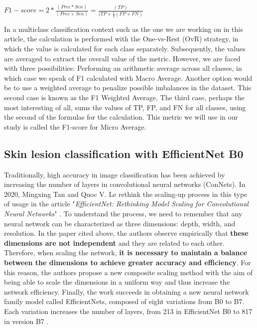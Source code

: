 \begin{enumerate}
    \hspace{3cm} $F1-score = 2 * \frac{(Prec * Sen)}{(Prec + Sen)} = \frac{(TP)}{(TP + \frac{1}{2}(FP + FN)}$

    In a multiclass classification context such as the one we are working on in this article, the calculation is performed with the One-vs-Rest (OvR) strategy, in which the value is calculated for each class separately. Subsequently, the values are averaged to extract the overall value of the metric. However, we are faced with three possibilities: Performing an arithmetic average across all classes, in which case we speak of F1 calculated with Macro Average. Another option would be to use a weighted average to penalize possible imbalances in the dataset. This second case is known as the F1 Weighted Average. The third case, perhaps the most interesting of all, sums the values of TP, FP, and FN for all classes, using the second of the formulas for the calculation. This metric we will use in our study is called the F1-score for Micro Average.
    
    
\end{enumerate}
    


\subsection{Skin lesion classification with EfficientNet B0}
Traditionally, high accuracy in image classification has been achieved by increasing the number of layers in convolutional neural networks (ConNets). In 2020, Mingxing Tan and Quoc V. Le rethink the scaling-up process in this type of usage in the article "\textit{EfficientNet: Rethinking Model Scaling for Convolutional Neural Networks}" \cite{tan_efficientnet_2020}. To understand the process, we need to remember that any neural network can be characterized as three dimensions: depth, width, and resolution. In the paper cited above, the authors observe empirically that \textbf{these dimensions are not independent} and they are related to each other. Therefore, when scaling the network, \textbf{it is necessary to maintain a balance between the dimensions to achieve greater accuracy and efficiency}. For this reason, the authors propose a new composite scaling method with the aim of being able to scale the dimensions in a uniform way and thus increase the network efficiency. Finally, the work succeeds in obtaining a new neural network family model called EfficientNets, composed of eight variations from B0 to B7. Each variation increases the number of layers, from 213 in EfficientNet B0 to 817 in version B7 \cite{medium_EfficientNet}. 

